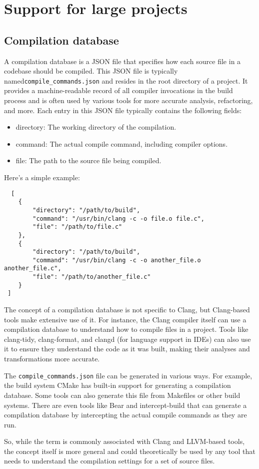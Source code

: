 \chapter{Support for large projects}
\pagestyle{fancy}
\fancyhf{}
\rhead{\thepage}

\section{Compilation database}
A compilation database is a JSON file that specifies how each source file in a codebase should be compiled. This JSON file is typically named\texttt{compile_commands.json} and resides in the root directory of a project. It provides a machine-readable record of all compiler invocations in the build process and is often used by various tools for more accurate analysis, refactoring, and more. Each entry in this JSON file typically contains the following fields:

\begin{itemize}
\item directory: The working directory of the compilation.
\item command: The actual compile command, including compiler options.
\item file: The path to the source file being compiled.
\end{itemize}
Here's a simple example:
\begin{verbatim}
  [
    {
        "directory": "/path/to/build",
        "command": "/usr/bin/clang -c -o file.o file.c",
        "file": "/path/to/file.c"
    },
    {
        "directory": "/path/to/build",
        "command": "/usr/bin/clang -c -o another_file.o another_file.c",
        "file": "/path/to/another_file.c"
    }
 ]
\end{verbatim}
The concept of a compilation database is not specific to Clang, but Clang-based
tools make extensive use of it. For instance, the Clang compiler itself can use
a compilation database to understand how to compile files in a project. Tools
like clang-tidy, clang-format, and clangd (for language support in IDEs) can
also use it to ensure they understand the code as it was built, making their
analyses and transformations more accurate. 

The \texttt{compile_commands.json} file can be generated in various ways. For example,
the build system CMake has built-in support for generating a compilation
database. Some tools can also generate this file from Makefiles or other build
systems. There are even tools like Bear and intercept-build that can generate a
compilation database by intercepting the actual compile commands as they are
run. 

So, while the term is commonly associated with Clang and LLVM-based tools, the
concept itself is more general and could theoretically be used by any tool that
needs to understand the compilation settings for a set of source files.
